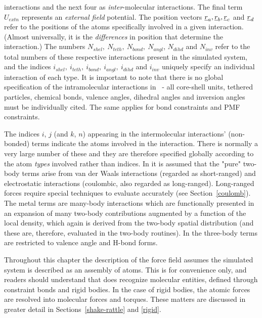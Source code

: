 interactions and the next four as {\em inter}-molecular
interactions.  The final term $U_{extn}$ represents an {\em
external field} potential.
The position vectors $\mbox{$\underline{r}$}_{a},\mbox{$\underline{r}$}_{b},\mbox{$\underline{r}$}_{c}$ and $\mbox{$\underline{r}$}_{d}$
refer to the positions of the atoms specifically involved in a given
interaction. (Almost universally, it is the {\em differences} in
position that determine the interaction.)  The numbers
$N_{shel},~N_{teth},~N_{bond},~N_{angl}$, $N_{dihd}$ and $N_{inv}$
refer to the total numbers of these respective interactions present
in the simulated system, and the indices
$i_{shel},~i_{teth},~i_{bond},~i_{angl},~i_{dihd}$ and $i_{inv}$
uniquely specify an individual interaction of each type.  It is
important to note that there is no global specification of the
intramolecular interactions in \D~- all core-shell units, tethered
particles, chemical bonds, valence angles, dihedral angles and
inversion angles must be individually cited.  The same applies for
bond constraints and PMF
constraints.

The indices $i$, $j$ (and $k$, $n$) appearing in the intermolecular
interactions' (non-bonded) terms
indicate the atoms involved in the interaction.
There is normally a very large number of these and they are
therefore specified globally according to the atom {\em types}
involved rather than indices.  In \D it is assumed that the "pure"
two-body terms arise from van der Waals interactions (regarded as short-ranged) and electrostatic
interactions (coulombic, also regarded as
long-ranged).  Long-ranged forces
require special techniques to evaluate accurately (see Section~\ref{coulomb}).
The metal terms are
many-body interactions which are functionally presented in an expansion of
many two-body contributions augmented by a function of the local density,
which again is derived from the two-body spatial distribution
(and these are, therefore, evaluated in the two-body
routines).  In \D the three-body terms
are restricted to valence angle and
H-bond forms.

Throughout this chapter the description of the force
field assumes the simulated system is described
as an assembly of atoms.  This is for convenience only, and
readers should understand that \D does recognize molecular
entities, defined through constraint bonds
and rigid bodies.  In the case of rigid bodies, the atomic forces
are resolved into molecular forces and torques.  These matters are
discussed in greater detail in Sections~\ref{shake-rattle} and \ref{rigid}.

